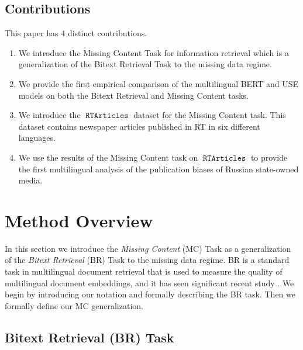 \documentclass[11pt]{article}
\newcommand{\defn}[1]{\emph{{#1}}}
\newcommand{\fixme}[1]{\textbf{FIXME: {#1}}}
\DeclareMathOperator{\dataset}{\texttt{RTArticles}}
\begin{document}

\subsection{Contributions}

This paper has 4 distinct contributions.

\begin{enumerate}
    \item 
        We introduce the Missing Content Task for information retrieval which is a generalization of the Bitext Retrieval Task to the missing data regime.
    \item 
        We provide the first empirical comparison of the multilingual BERT and USE models on both the Bitext Retrieval and Missing Content tasks.
    \item 
        We introduce the $\dataset$ dataset for the Missing Content task.
        This dataset contains newspaper articles published in RT in six different languages.
    \item 
        We use the results of the Missing Content task on $\dataset$ to provide the first multilingual analysis of the publication biases of Russian state-owned media.
\end{enumerate}

\section{Method Overview}
\label{sec:method}

In this section we introduce the \defn{Missing Content} (MC) Task as a generalization of the \defn{Bitext Retrieval} (BR) Task to the missing data regime.
BR is a standard task in multilingual document retrieval that is used to measure the quality of multilingual document embeddings, and it has seen significant recent study \cite{}.
We begin by introducing our notation and formally describing the BR task.
Then we formally define our MC generalization.

\subsection{Bitext Retrieval (BR) Task}
\end{document}
